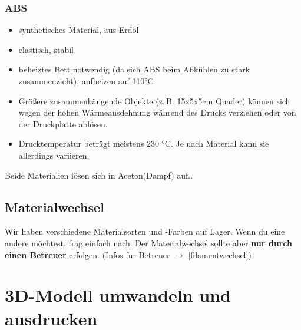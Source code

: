 \documentclass{\basedir/fablab-document}
\begin{document}
\subsubsection{ABS}
\begin{itemize}
 \item synthetisches Material, aus Erdöl
 \item elastisch, stabil
 \item beheiztes Bett notwendig (da sich ABS beim Abkühlen zu stark zusammenzieht), aufheizen auf 110°C
 \item Größere zusammenhängende Objekte (z.\,B. 15x5x5cm Quader) können sich wegen der hohen Wärmeausdehnung während des Drucks verziehen oder von der Druckplatte ablösen.
 \item Drucktemperatur beträgt meistens 230 °C. Je nach Material kann sie allerdings variieren.
\end{itemize}

Beide Materialien lösen sich in Aceton(Dampf) auf..

\subsection{Materialwechsel}
Wir haben verschiedene Materialsorten und -Farben auf Lager. Wenn du eine andere möchtest, frag einfach nach.
Der Materialwechsel sollte aber \textbf{nur durch einen Betreuer} erfolgen. (Infos für Betreuer $\to$ \ref{filamentwechsel})


\section{3D-Modell umwandeln und ausdrucken}
\end{document}
